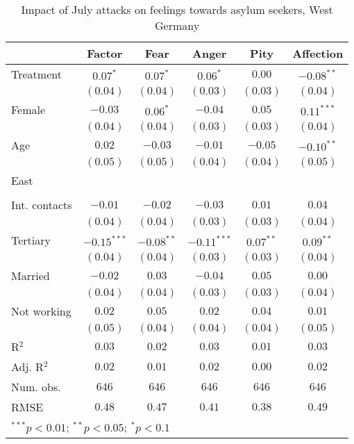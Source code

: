 
\begin{table}
\caption{Impact of July attacks on feelings towards asylum seekers, West Germany}
\begin{center}
\begin{tabular}{l c c c c c}
\toprule
 & Factor & Fear & Anger & Pity & Affection \\
\midrule
Treatment     & $0.07^{*}$    & $0.07^{*}$   & $0.06^{*}$    & $0.00$      & $-0.08^{**}$ \\
              & $(0.04)$      & $(0.04)$     & $(0.03)$      & $(0.03)$    & $(0.04)$     \\
Female        & $-0.03$       & $0.06^{*}$   & $-0.04$       & $0.05$      & $0.11^{***}$ \\
              & $(0.04)$      & $(0.04)$     & $(0.03)$      & $(0.03)$    & $(0.04)$     \\
Age           & $0.02$        & $-0.03$      & $-0.01$       & $-0.05$     & $-0.10^{**}$ \\
              & $(0.05)$      & $(0.05)$     & $(0.04)$      & $(0.04)$    & $(0.05)$     \\
East          &               &              &               &             &              \\
              &               &              &               &             &              \\
Int. contacts & $-0.01$       & $-0.02$      & $-0.03$       & $0.01$      & $0.04$       \\
              & $(0.04)$      & $(0.04)$     & $(0.03)$      & $(0.03)$    & $(0.04)$     \\
Tertiary      & $-0.15^{***}$ & $-0.08^{**}$ & $-0.11^{***}$ & $0.07^{**}$ & $0.09^{**}$  \\
              & $(0.04)$      & $(0.04)$     & $(0.03)$      & $(0.03)$    & $(0.04)$     \\
Married       & $-0.02$       & $0.03$       & $-0.04$       & $0.05$      & $0.00$       \\
              & $(0.04)$      & $(0.04)$     & $(0.03)$      & $(0.03)$    & $(0.04)$     \\
Not working   & $0.02$        & $0.05$       & $0.02$        & $0.04$      & $0.01$       \\
              & $(0.05)$      & $(0.04)$     & $(0.04)$      & $(0.04)$    & $(0.05)$     \\
\midrule
R$^2$         & $0.03$        & $0.02$       & $0.03$        & $0.01$      & $0.03$       \\
Adj. R$^2$    & $0.02$        & $0.01$       & $0.02$        & $0.00$      & $0.02$       \\
Num. obs.     & $646$         & $646$        & $646$         & $646$       & $646$        \\
RMSE          & $0.48$        & $0.47$       & $0.41$        & $0.38$      & $0.49$       \\
\bottomrule
\multicolumn{6}{l}{\scriptsize{$^{***}p<0.01$; $^{**}p<0.05$; $^{*}p<0.1$}}
\end{tabular}
\label{tab_emo_west}
\end{center}
\end{table}
